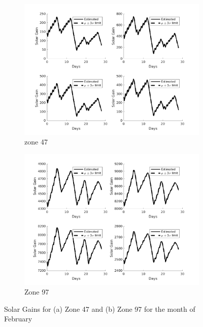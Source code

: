 \begin{figure}[H]
\begin{subfigure}{0.45\textwidth}
\centering
\includegraphics[width=\textwidth]{jbs_figures/solar_2_2}
\caption{zone 47}
\label{solar_2_2}
\end{subfigure}
\centering
\begin{subfigure}{0.45\textwidth}
\includegraphics[width=\textwidth]{jbs_figures/solar_3_2}
\caption{Zone 97}
\label{solar_3_2}
\end{subfigure} 
\caption{Solar Gains for (a) Zone 47 and (b) Zone 97 for the month of February}
\label{Zone_solar_temperature_feb}
\end{figure}


